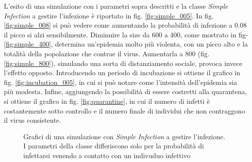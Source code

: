 \documentclass[a4paper,10pt,twocolumn]{article}
\begin{document}
L'esito di una simulazione con i parametri sopra descritti e la classe \emph{Simple Infection} a gestire l'infezione è riportato in fig. \ref{fig:simple_005}. In fig. \ref{fig:simple_008} si può vedere come aumentando la probabilità di infezione a 0.08 il picco si alzi sensibilmente. Diminuire la size da 600 a 400, come mostrato in fig- \ref{fig:simple_400}, determina un'epidemia molto più violenta, con un picco alto e la totalità della popolazione che contrae il virus. Aumentarla a 800 (fig. \ref{fig:simple_800}), simulando una sorta di distanziamento sociale, provoca invece l'effetto opposto. Introducendo un periodo di incubazione si ottiene il grafico in fig. \ref{fig:incubation_005}, in cui si può notare come l'intensità dell'epidemia sia più modesta. Infine, aggiungendo la possibilità di essere costretti alla quarantena, si ottiene il grafico in fig. \ref{fig:quarantine}, in cui il numero di infetti è costantemente sotto controllo e il numero finale di individui che non contraggono il virus consistente.

\begin{figure}[p]
    \centering
    \caption{Grafici di una simulazione con \emph{Simple Infection} a gestire l'infezione. I parametri della classe differiscono solo per la probabilità di infettarsi venendo a contatto con un indivuduo infettivo}
\end{figure}
\end{document}
